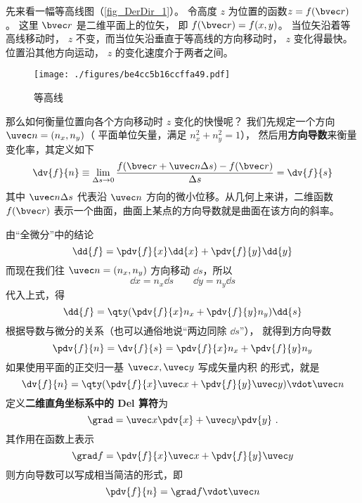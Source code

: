 
先来看一幅等高线图（\autoref{fig_DerDir_1}）。 令高度 $z$ 为位置的函数$z = f(\bvec r)$。 这里 $\bvec r$ 是二维平面上的位矢， 即 $f(\bvec r) = f(x,y)$。 当位矢沿着等高线移动时， $z$ 不变，而当位矢沿垂直于等高线的方向移动时， $z$ 变化得最快。位置沿其他方向运动， $z$ 的变化速度介于两者之间。

\begin{figure}[ht]
\centering
\texttt{[image: ./figures/be4cc5b16ccffa49.pdf]}
\caption{等高线}\label{fig_DerDir_1}
\end{figure}

那么如何衡量位置向各个方向移动时 $z$ 变化的快慢呢？ 我们先规定一个方向 $\uvec n = (n_x,n_y)$（ 平面单位矢量，满足 $n_x^2 + n_y^2 = 1$）， 然后用\textbf{方向导数}来衡量变化率，其定义如下
 \begin{equation}
\dv{f}{n} \equiv \lim_{\Delta s \to 0} \frac{f(\bvec r + \uvec n\Delta s) - f(\bvec r)}{\Delta s} = \dv{f}{s}
\end{equation}
其中 $\uvec n\Delta s$ 代表沿 $\uvec n$ 方向的微小位移。从几何上来讲，二维函数 $f(\bvec r)$ 表示一个曲面，曲面上某点的方向导数就是曲面在该方向的斜率。


由“全微分”中的结论
\begin{equation}
\dd{f} = \pdv{f}{x} \dd{x} + \pdv{f}{y} \dd{y}
\end{equation}
而现在我们往 $\uvec n = (n_x, n_y)$ 方向移动 $\dd{s}$，所以
\begin{equation}
\dd{x} = n_x \dd{s} \qquad \dd{y} = n_y \dd{s}
\end{equation}
代入上式，得
\begin{equation}
\dd{f} =  \qty(\pdv{f}{x} n_x + \pdv{f}{y} n_y ) \dd{s}
\end{equation}
根据导数与微分的关系（也可以通俗地说“两边同除 $\dd{s}$”）， 就得到方向导数
\begin{equation}
\pdv{f}{n} = \dv{f}{s} = \pdv{f}{x} n_x + \pdv{f}{y} n_y
\end{equation}
如果使用平面的正交归一基 $\uvec x, \uvec y$ 写成矢量内积 的形式，就是
\begin{equation}
\dv{f}{n} = \qty( \pdv{f}{x}\uvec x + \pdv{f}{y}\uvec y ) \vdot \uvec n
\end{equation} 
定义\textbf{二维直角坐标系中的 Del 算符}为
\begin{equation}
\grad  = \uvec x\pdv{x} + \uvec y\pdv{y}~.
\end{equation}
其作用在函数上表示
\begin{equation}
\grad f = \pdv{f}{x}\uvec x + \pdv{f}{y}\uvec y
\end{equation} 
则方向导数可以写成相当简洁的形式，即
\begin{equation}\label{eq_DerDir_7}
\pdv{f}{n} = \grad f \vdot \uvec n
\end{equation} 

